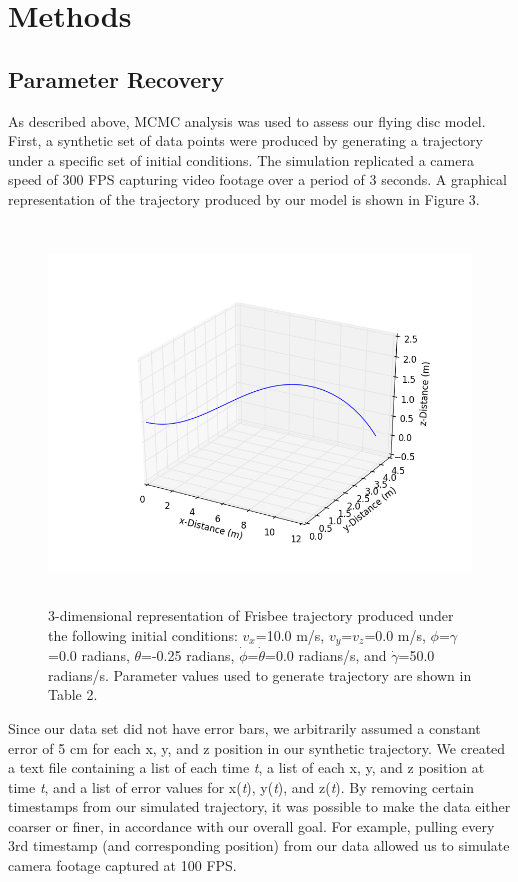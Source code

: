 \documentclass[a4paper,12pt, oneside]{article}
\begin{document}
\section{Methods}
\subsection{Parameter Recovery}
As described above, MCMC analysis was used to assess our flying disc model. First, a synthetic set of data points were produced by generating a trajectory under a specific set of initial conditions. The simulation replicated a camera speed of 300 FPS capturing video footage over a period of 3 seconds. A graphical representation of the trajectory produced by our model is shown in Figure 3. 
\begin{figure}[h]
	\centering
	\includegraphics[width=16cm, height=10cm]{Simulated_throw_graph}
	\caption{3-dimensional representation of Frisbee trajectory produced under the following initial conditions: $v_x$=10.0 m/s, $v_y$=$v_z$=0.0 m/s, $\phi$=$\gamma$=0.0 radians, $\theta$=-0.25 radians, $\dot\phi$=$\dot\theta$=0.0 radians/s, and $\dot\gamma$=50.0 radians/s. Parameter values used to generate trajectory are shown in Table 2. }
\end{figure}

Since our data set did not have error bars, we arbitrarily assumed a constant error of 5 cm for each x, y, and z position in our synthetic trajectory. We created a text file containing a list of each time \textit{t}, a list of each x, y, and z position at time \textit{t}, and a list of error values for x(\textit{t}), y(\textit{t}), and z(\textit{t}). By removing certain timestamps from our simulated trajectory, it was possible to make the data either coarser or finer, in accordance with our overall goal. For example, pulling every 3rd timestamp (and corresponding position) from our data  allowed us to simulate camera footage captured at 100 FPS.
\end{document}
